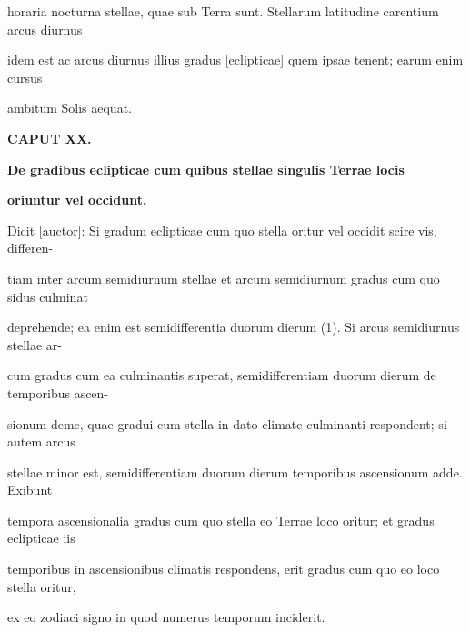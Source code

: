 \documentclass[11pt]{article}
\begin{document}
\noindent\hypertarget{AB01-PDF0122-body-L001}{}horaria nocturna stellae, quae sub Terra sunt. Stellarum latitudine carentium arcus diurnus\strut\par
\noindent\hypertarget{AB01-PDF0122-body-L002}{}idem est ac arcus diurnus illius gradus [eclipticae] quem ipsae tenent; earum enim cursus\strut\par
\noindent\hypertarget{AB01-PDF0122-body-L003}{}ambitum Solis aequat.\strut\par
\hypertarget{AB01-PDF0122-body-L004}{}\begin{center}\bfseries CAPUT XX.\end{center}
\hypertarget{AB01-PDF0122-body-L005}{}\begin{center}\bfseries De gradibus eclipticae cum quibus stellae singulis Terrae locis\end{center}
\hypertarget{AB01-PDF0122-body-L006}{}\begin{center}\bfseries oriuntur vel occidunt.\end{center}
\noindent\hypertarget{AB01-PDF0122-body-L007}{}Dicit [auctor]: Si gradum eclipticae cum quo stella oritur vel occidit scire vis, differen-\strut\par
\noindent\hypertarget{AB01-PDF0122-body-L008}{}tiam inter arcum semidiurnum stellae et arcum semidiurnum gradus cum quo sidus culminat\strut\par
\noindent\hypertarget{AB01-PDF0122-body-L009}{}deprehende; ea enim est semidifferentia duorum dierum (1). Si arcus semidiurnus stellae ar-\strut\par
\noindent\hypertarget{AB01-PDF0122-body-L010}{}cum gradus cum ea culminantis superat, semidifferentiam duorum dierum de temporibus ascen-\strut\par
\noindent\hypertarget{AB01-PDF0122-body-L011}{}sionum deme, quae gradui cum stella in dato climate culminanti respondent; si autem arcus\strut\par
\noindent\hypertarget{AB01-PDF0122-body-L012}{}stellae minor est, semidifferentiam duorum dierum temporibus ascensionum adde. Exibunt\strut\par
\noindent\hypertarget{AB01-PDF0122-body-L013}{}tempora ascensionalia gradus cum quo stella eo Terrae loco oritur; et gradus eclipticae iis\strut\par
\noindent\hypertarget{AB01-PDF0122-body-L014}{}temporibus in ascensionibus climatis respondens, erit gradus cum quo eo loco stella oritur,\strut\par
\noindent\hypertarget{AB01-PDF0122-body-L015}{}ex eo zodiaci signo in quod numerus temporum inciderit.\strut\par
\end{document}
